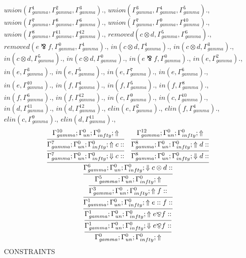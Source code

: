 \documentclass[a4paper, 11pt]{article}
\begin{document}
$union(\Gamma_{gamma}^{1}, \Gamma_{gamma}^{2}, \Gamma_{gamma}^{3}).$, $union(\Gamma_{gamma}^{3}, \Gamma_{gamma}^{4}, \Gamma_{gamma}^{5}).$, $union(\Gamma_{gamma}^{7}, \Gamma_{gamma}^{8}, \Gamma_{gamma}^{6}).$, $union(\Gamma_{gamma}^{7}, \Gamma_{gamma}^{9}, \Gamma_{gamma}^{10}).$, $union(\Gamma_{gamma}^{8}, \Gamma_{gamma}^{11}, \Gamma_{gamma}^{12}).$, $removed(c \otimes d, \Gamma_{gamma}^{5}, \Gamma_{gamma}^{6}).$, $removed(e \bindnasrepma f, \Gamma_{gamma}^{0}, \Gamma_{gamma}^{1}).$, $in(c \otimes d, \Gamma_{gamma}^{1}).$, $in(c \otimes d, \Gamma_{gamma}^{3}).$, $in(c \otimes d, \Gamma_{gamma}^{5}).$, $in(c \otimes d, \Gamma_{gamma}^{0}).$, $in(e \bindnasrepma f, \Gamma_{gamma}^{0}).$, $in(e, \Gamma_{gamma}^{2}).$, $in(e, \Gamma_{gamma}^{3}).$, $in(e, \Gamma_{gamma}^{5}).$, $in(e, \Gamma_{gamma}^{7}).$, $in(e, \Gamma_{gamma}^{6}).$, $in(e, \Gamma_{gamma}^{10}).$, $in(f, \Gamma_{gamma}^{4}).$, $in(f, \Gamma_{gamma}^{5}).$, $in(f, \Gamma_{gamma}^{8}).$, $in(f, \Gamma_{gamma}^{6}).$, $in(f, \Gamma_{gamma}^{12}).$, $in(c, \Gamma_{gamma}^{9}).$, $in(c, \Gamma_{gamma}^{10}).$, $in(d, \Gamma_{gamma}^{11}).$, $in(d, \Gamma_{gamma}^{12}).$, $elin(e, \Gamma_{gamma}^{2}).$, $elin(f, \Gamma_{gamma}^{4}).$, $elin(c, \Gamma_{gamma}^{9}).$, $elin(d, \Gamma_{gamma}^{11}).$, 
\[
\infer{\Gamma_{ gamma}^{0} ; \Gamma_{un}^{0} ; \Gamma_{ infty}^{0} ;  \Uparrow }
{\infer{\Gamma_{ gamma}^{1} ; \Gamma_{un}^{0} ; \Gamma_{ infty}^{0} ;  \Downarrow e \bindnasrepma f :: }
{\infer{\Gamma_{ gamma}^{1} ; \Gamma_{un}^{0} ; \Gamma_{ infty}^{0} ;  \Uparrow e \bindnasrepma f :: }
{\infer{\Gamma_{ gamma}^{1} ; \Gamma_{un}^{0} ; \Gamma_{ infty}^{0} ;  \Uparrow e :: f :: }
{\infer{\Gamma_{ gamma}^{3} ; \Gamma_{un}^{0} ; \Gamma_{ infty}^{0} ;  \Uparrow f :: }
{\infer{\Gamma_{ gamma}^{5} ; \Gamma_{un}^{0} ; \Gamma_{ infty}^{0} ;  \Uparrow }
{\infer{\Gamma_{ gamma}^{6} ; \Gamma_{un}^{0} ; \Gamma_{ infty}^{0} ;  \Downarrow c \otimes d :: }
{\infer{\Gamma_{ gamma}^{7} ; \Gamma_{un}^{0} ; \Gamma_{ infty}^{0} ;  \Downarrow c :: }
{\infer{\Gamma_{ gamma}^{7} ; \Gamma_{un}^{0} ; \Gamma_{ infty}^{0} ;  \Uparrow c :: }
{\Gamma_{ gamma}^{10} ; \Gamma_{un}^{0} ; \Gamma_{ infty}^{0} ;  \Uparrow }}
&
\infer{\Gamma_{ gamma}^{8} ; \Gamma_{un}^{0} ; \Gamma_{ infty}^{0} ;  \Downarrow d :: }
{\infer{\Gamma_{ gamma}^{8} ; \Gamma_{un}^{0} ; \Gamma_{ infty}^{0} ;  \Uparrow d :: }
{\Gamma_{ gamma}^{12} ; \Gamma_{un}^{0} ; \Gamma_{ infty}^{0} ;  \Uparrow }}}}}}}}}
\]
CONSTRAINTS
\end{document}
